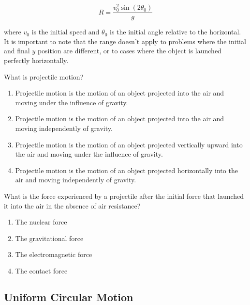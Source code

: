 \documentclass[main-physics.tex]{subfiles}
\begin{document}
\begin{equation} \label{GqvaN1}
    R = \frac{v_0^2 \sin{(2\theta_0)}}{g}
\end{equation}

where $v_0$ is the initial speed and $\theta_0$ is the initial angle relative to the horizontal. It is important to note that the range doesn't apply to problems where the initial and final $y$ position are different, or to cases where the object is launched perfectly horizontally.

\begin{exercise}
    What is projectile motion?
    
    \begin{enumerate}[label=\Alph*.]
        \item Projectile motion is the motion of an object projected into the air and moving under the influence of gravity.
        \item Projectile motion is the motion of an object projected into the air and moving independently of gravity.
        \item Projectile motion is the motion of an object projected vertically upward into the air and moving under the influence of gravity.
        \item Projectile motion is the motion of an object projected horizontally into the air and moving independently of gravity.
    \end{enumerate}
\end{exercise}

\begin{exercise}
    What is the force experienced by a projectile after the initial force that launched it into the air in the absence of air resistance?

    \begin{enumerate}[label=\Alph*.]
        \item The nuclear force
        \item The gravitational force
        \item The electromagnetic force
        \item The contact force
    \end{enumerate}
\end{exercise}






\subsection{Uniform Circular Motion} \label{uPOucv}
\end{document}
